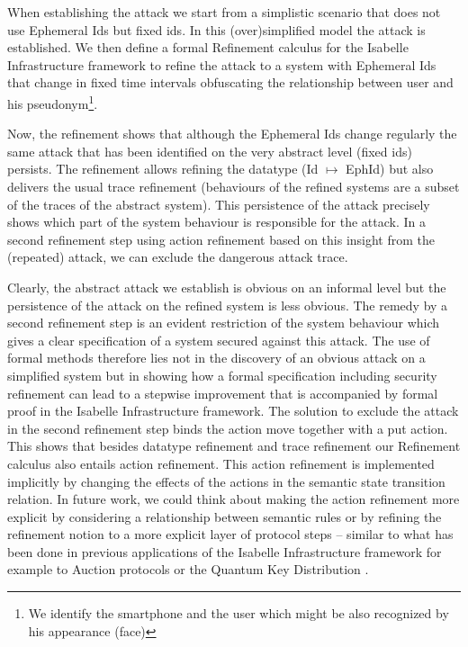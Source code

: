 \documentclass{llncs}
\begin{document}
When establishing the attack we start from a simplistic scenario that does not use Ephemeral Ids but fixed ids.
In this (over)simplified model the attack is established. We then define a formal Refinement calculus for
the Isabelle Infrastructure framework to refine the attack to a system with Ephemeral Ids that change in fixed
time intervals obfuscating the relationship between user and his pseudonym\footnote{We identify the smartphone
  and the user which might be also recognized by his appearance (face)}.

Now, the refinement shows that although the Ephemeral Ids change regularly the same attack that has been
identified on the very abstract level (fixed ids) persists.
The refinement allows refining the datatype (Id $\mapsto$ EphId) but also delivers the usual trace
refinement (behaviours of the refined systems are a subset of the traces of the abstract system).
This persistence of the attack precisely shows which part of the system behaviour is responsible for the
attack. In a second refinement step using action refinement based on this insight from the (repeated)
attack, we can exclude the dangerous attack trace.

Clearly, the abstract attack we establish is obvious on an informal level but the persistence of the attack
on the refined system is less obvious. The remedy by a second refinement step is an evident restriction of
the system behaviour which gives a clear specification of a system secured against this attack. The use of
formal methods therefore lies not in the discovery of an obvious attack on a simplified system but in showing
how a formal specification including security refinement can lead to a stepwise improvement that is accompanied
by formal proof in the Isabelle Infrastructure framework. The solution to exclude the attack in the second refinement
step binds the action move together with a put action. %
This shows that besides datatype refinement and trace refinement our Refinement calculus also entails action
refinement. This action refinement is implemented implicitly by changing the effects of the actions
in the semantic state transition relation. In future work, we could think about making the action refinement
more explicit by considering a relationship between semantic rules or by refining the refinement notion to
a more explicit layer of protocol steps -- similar to what has been done in previous applications of the
Isabelle Infrastructure framework for example to Auction protocols \cite{kkp:17} or the Quantum Key Distribution \cite{kam:19c}.
\end{document}

